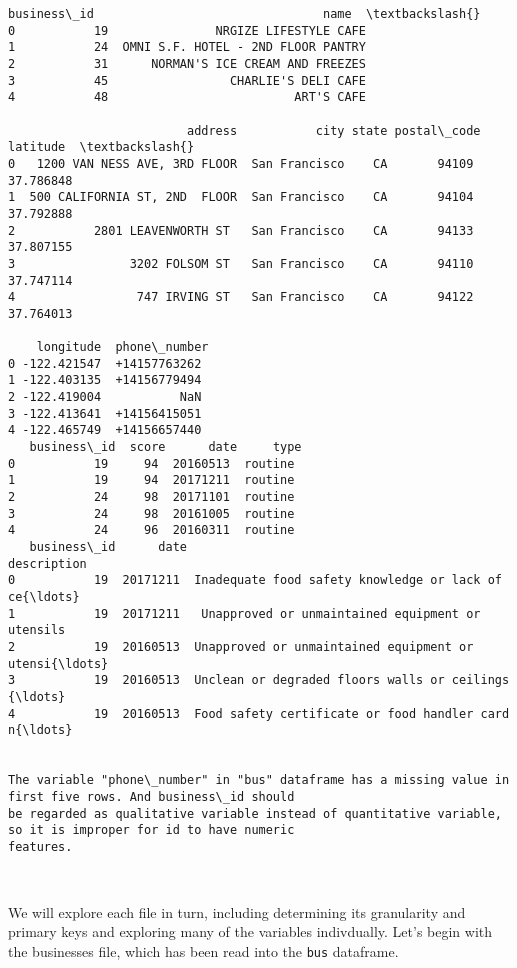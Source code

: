 \documentclass[11pt]{article}
\begin{document}
    \begin{Verbatim}[commandchars=\\\{\}]
   business\_id                                name  \textbackslash{}
0           19               NRGIZE LIFESTYLE CAFE   
1           24  OMNI S.F. HOTEL - 2ND FLOOR PANTRY   
2           31      NORMAN'S ICE CREAM AND FREEZES   
3           45                 CHARLIE'S DELI CAFE   
4           48                          ART'S CAFE   

                         address           city state postal\_code   latitude  \textbackslash{}
0   1200 VAN NESS AVE, 3RD FLOOR  San Francisco    CA       94109  37.786848   
1  500 CALIFORNIA ST, 2ND  FLOOR  San Francisco    CA       94104  37.792888   
2           2801 LEAVENWORTH ST   San Francisco    CA       94133  37.807155   
3                3202 FOLSOM ST   San Francisco    CA       94110  37.747114   
4                 747 IRVING ST   San Francisco    CA       94122  37.764013   

    longitude  phone\_number  
0 -122.421547  +14157763262  
1 -122.403135  +14156779494  
2 -122.419004           NaN  
3 -122.413641  +14156415051  
4 -122.465749  +14156657440  
   business\_id  score      date     type
0           19     94  20160513  routine
1           19     94  20171211  routine
2           24     98  20171101  routine
3           24     98  20161005  routine
4           24     96  20160311  routine
   business\_id      date                                        description
0           19  20171211  Inadequate food safety knowledge or lack of ce{\ldots}
1           19  20171211   Unapproved or unmaintained equipment or utensils
2           19  20160513  Unapproved or unmaintained equipment or utensi{\ldots}
3           19  20160513  Unclean or degraded floors walls or ceilings  {\ldots}
4           19  20160513  Food safety certificate or food handler card n{\ldots}


The variable "phone\_number" in "bus" dataframe has a missing value in first five rows. And business\_id should 
be regarded as qualitative variable instead of quantitative variable, so it is improper for id to have numeric
features.



    \end{Verbatim}

    We will explore each file in turn, including determining its granularity
and primary keys and exploring many of the variables indivdually. Let's
begin with the businesses file, which has been read into the
\texttt{bus} dataframe.
\end{document}
